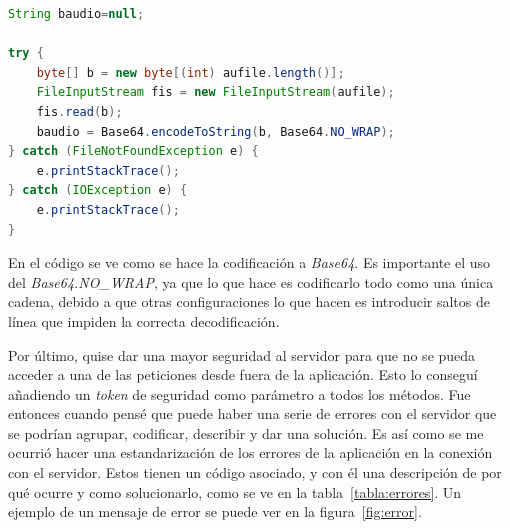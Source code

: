 \begin{lstlisting}[language={Java}]
String baudio=null;

try {
	byte[] b = new byte[(int) aufile.length()];
	FileInputStream fis = new FileInputStream(aufile);
	fis.read(b);
	baudio = Base64.encodeToString(b, Base64.NO_WRAP);
} catch (FileNotFoundException e) {
	e.printStackTrace();
} catch (IOException e) {
	e.printStackTrace();
}	
\end{lstlisting}

En el código se ve como se hace la codificación a \textit{Base64}. Es importante el uso del \textit{Base64.NO\_WRAP}, ya que lo que hace es codificarlo todo como una única cadena, debido a que otras configuraciones lo que hacen es introducir saltos de línea que impiden la correcta decodificación.

Por último, quise dar una mayor seguridad al servidor para que no se pueda acceder a una de las peticiones desde fuera de la aplicación. Esto lo conseguí añadiendo un \textit{token} de seguridad como parámetro a todos los métodos. Fue entonces cuando pensé que puede haber una serie de errores con el servidor que se podrían agrupar, codificar, describir y dar una solución. Es así como se me ocurrió hacer una estandarización de los errores de la aplicación en la conexión con el servidor. Estos tienen un código asociado, y con él una descripción de por qué ocurre y como solucionarlo, como se ve en la tabla~\ref{tabla:errores}. Un ejemplo de un mensaje de error se puede ver en la figura~\ref{fig:error}.
	
